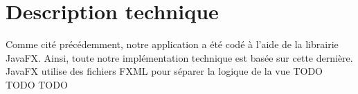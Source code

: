 \section{Description technique}

Comme cité précédemment, notre application a été codé à l'aide de la librairie JavaFX. Ainsi, toute notre implémentation technique est basée sur cette dernière. JavaFX utilise des fichiers FXML pour séparer la logique de la vue TODO TODO TODO